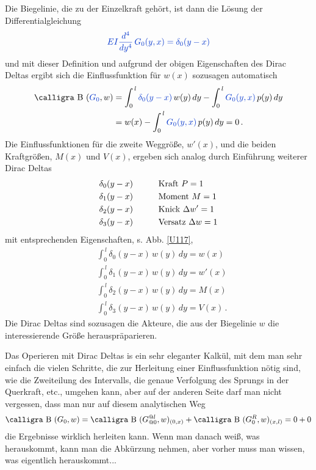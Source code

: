 Die Biegelinie, die zu der Einzelkraft geh\"{o}rt, ist dann die L\"{o}sung der Differentialgleichung
\begin{align}
\textcolor{chapterTitleBlue}{EI \frac{d^4}{dy^4}\,G_0(y,x) = \delta_0(y-x)}
\end{align}
und mit dieser Definition und aufgrund der obigen Eigenschaften des Dirac Deltas ergibt sich die Einflussfunktion f\"{u}r $w(x) $ sozusagen automatisch
\begin{align}
\text{\normalfont\calligra B\,\,}(\textcolor{chapterTitleBlue}{G_0},w) &= \int_0^{\,l} \textcolor{chapterTitleBlue}{\delta_0(y-x)}\,w(y)\,dy - \int_0^{\,l} \textcolor{chapterTitleBlue}{G_0(y,x)}\,p(y)\,dy \nn \\
&= w(x) - \int_0^{\,l} \textcolor{chapterTitleBlue}{G_0(y,x)}\,p(y)\,dy  = 0\,.
\end{align}
Die Einflussfunktionen f\"{u}r die zweite Weggr\"{o}{\ss}e, $w'(x) $, und die beiden Kraftgr\"{o}{\ss}en, $M(x) $ und $V(x) $, ergeben sich analog durch Einf\"{u}hrung weiterer Dirac Deltas
\begin{alignat}{2}
&\delta_0(y-x) \qquad &&\text{Kraft $P = 1$}\nonumber \\
&\delta_1(y-x) \qquad &&\text{Moment $M = 1$}\nonumber \\
&\delta_2(y-x) \qquad &&\text{Knick $\Delta w' = 1$}\nonumber\\
&\delta_3(y-x) \qquad &&\text{Versatz $\Delta w = 1$}\nonumber
\end{alignat}
mit entsprechenden Eigenschaften, s. Abb. \ref{U117},
\begin{subequations}
\begin{alignat}{2}
&\int_0^{\,l} \delta_0(y-x)\,w(y)\,dy = w(x) \\
&\int_0^{\,l} \delta_1(y-x)\,w(y)\,dy = w'(x) \\
&\int_0^{\,l} \delta_2(y-x)\,w(y)\,dy = M(x) \\
&\int_0^{\,l} \delta_3(y-x)\,w(y)\,dy = V(x)\,.
\end{alignat}
\end{subequations}
Die Dirac Deltas sind sozusagen die Akteure, die aus der Biegelinie $w$ die interessierende Gr\"{o}{\ss}e herauspr\"{a}parieren.

Das Operieren mit Dirac Deltas is ein sehr eleganter Kalk\"{u}l, mit dem man sehr einfach die vielen Schritte, die zur Herleitung einer Einflussfunktion n\"{o}tig sind, wie die Zweiteilung des Intervalls, die genaue Verfolgung des Sprungs in der Querkraft, etc., umgehen kann, aber auf der anderen Seite darf man nicht vergessen, dass man nur auf diesem analytischen Weg
\begin{align}
\text{\normalfont\calligra B\,\,}(G_0,w) = \text{\normalfont\calligra B\,\,}(G_{@0}^{@l},w)_{(0,x)} + \text{\normalfont\calligra B\,\,}(G_0^R,w)_{(x,l)} = 0 + 0
\end{align}
die Ergebnisse wirklich herleiten kann. Wenn man danach wei{\ss}, was herauskommt, kann man die Abk\"{u}rzung nehmen, aber vorher muss man wissen, was eigentlich herauskommt...

